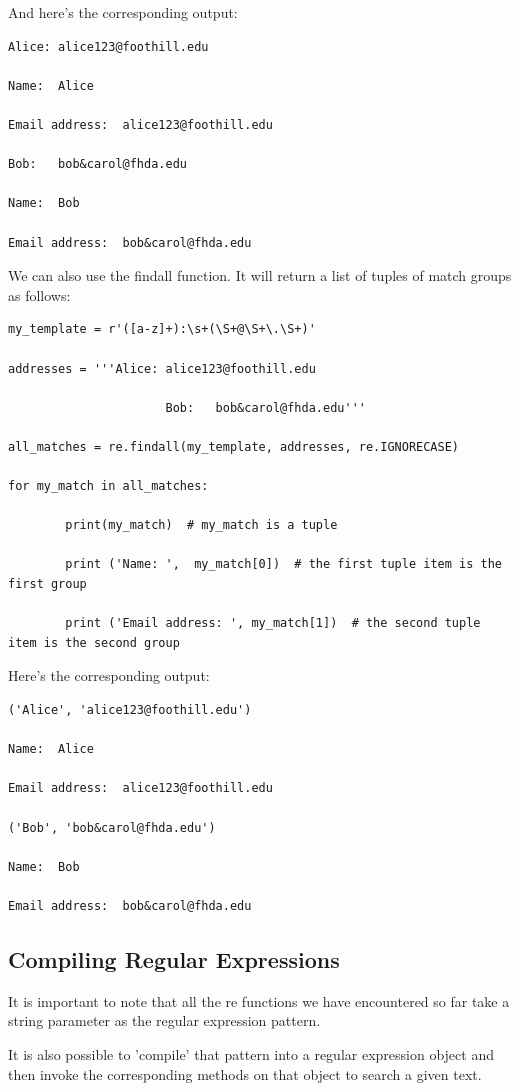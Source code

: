 \documentclass{article}
\begin{document}
And here's the corresponding output:

\begin{lstlisting}
Alice: alice123@foothill.edu

Name:  Alice

Email address:  alice123@foothill.edu

Bob:   bob&carol@fhda.edu

Name:  Bob

Email address:  bob&carol@fhda.edu
\end{lstlisting}

We can also use the findall function.  It will return a list of tuples of match groups as follows:

\begin{lstlisting}
my_template = r'([a-z]+):\s+(\S+@\S+\.\S+)'

addresses = '''Alice: alice123@foothill.edu
 
                      Bob:   bob&carol@fhda.edu'''
 
all_matches = re.findall(my_template, addresses, re.IGNORECASE)
 
for my_match in all_matches:
 
        print(my_match)  # my_match is a tuple
 
        print ('Name: ',  my_match[0])  # the first tuple item is the first group
 
        print ('Email address: ', my_match[1])  # the second tuple item is the second group
\end{lstlisting}
 
Here's the corresponding output:
\begin{lstlisting}
('Alice', 'alice123@foothill.edu')

Name:  Alice

Email address:  alice123@foothill.edu

('Bob', 'bob&carol@fhda.edu')

Name:  Bob

Email address:  bob&carol@fhda.edu
\end{lstlisting}

\subsection{Compiling Regular Expressions}
 It is important to note that all the re functions we have encountered so far take a string parameter as the regular expression pattern.

It is also possible to 'compile' that pattern into a regular expression object and then invoke the corresponding methods on that object to search a given text.
\end{document}
